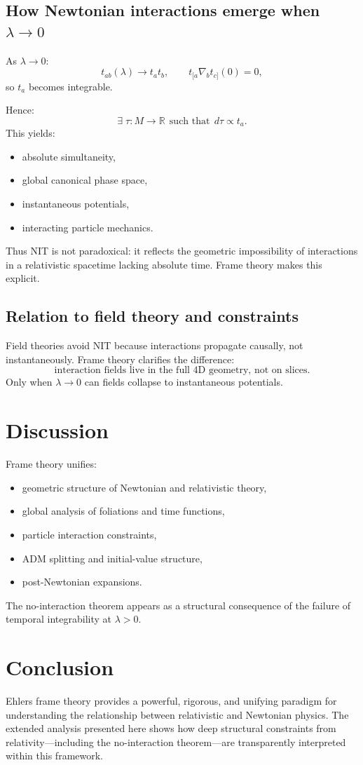 \documentclass[12pt]{article}
\begin{document}
\subsection{How Newtonian interactions emerge when $\lambda\to0$}

As $\lambda\to0$:
\[
t_{ab}(\lambda) \to t_a t_b,
\qquad 
t_{[a}\nabla_b t_{c]}(0) = 0,
\]
so $t_a$ becomes integrable.

Hence:
\[
\exists\; \tau: M\to\mathbb{R} \ \ \text{such that}\ \ d\tau \propto t_a.
\]
This yields:
\begin{itemize}
\item absolute simultaneity,
\item global canonical phase space,
\item instantaneous potentials,
\item interacting particle mechanics.
\end{itemize}

Thus NIT is not paradoxical: 
it reflects the geometric impossibility of interactions 
in a relativistic spacetime lacking absolute time.
Frame theory makes this explicit.

\subsection{Relation to field theory and constraints}

Field theories avoid NIT because interactions propagate causally, not 
instantaneously.
Frame theory clarifies the difference:
\[
\text{interaction fields live in the full 4D geometry, not on slices.}
\]
Only when $\lambda\to0$ can fields collapse to instantaneous potentials.

\section{Discussion}

Frame theory unifies:
\begin{itemize}
\item geometric structure of Newtonian and relativistic theory,
\item global analysis of foliations and time functions,
\item particle interaction constraints,
\item ADM splitting and initial-value structure,
\item post-Newtonian expansions.
\end{itemize}

The no-interaction theorem appears as a structural consequence of 
the failure of temporal integrability at $\lambda>0$.

\section{Conclusion}

Ehlers frame theory provides a powerful, rigorous, and unifying paradigm 
for understanding the relationship between relativistic and Newtonian physics.
The extended analysis presented here shows how deep structural constraints 
from relativity---including the no-interaction theorem---are transparently 
interpreted within this framework.
\end{document}
